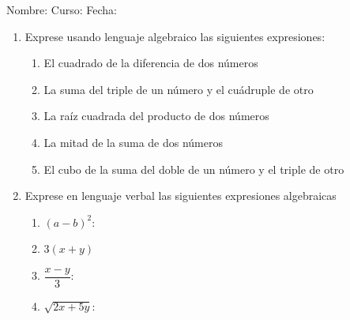 \documentclass[letterpaper,fleqn]{article}
\newcommand{\LineaNombre}{%
\par
\vspace{\baselineskip}
Nombre:\hrulefill \; Curso: \underline{\hspace*{48pt}} \; Fecha: \underline{\hspace*{2.5cm}} \relax
\par}
\begin{document}
\LineaNombre
\begin{enumerate}
 \item Exprese usando lenguaje algebraico las siguientes expresiones:
 \begin{enumerate}
  \item El cuadrado de la diferencia de dos números \answer*[0pt]
  \item La suma del triple de un número y el cuádruple de otro \answer*[0pt]
  \item La raíz cuadrada del producto de dos números\answer*[0pt]
  \item La mitad de la suma de dos números \answer*[0pt]
  \item El cubo de la suma del doble de un número y el triple de otro \answer*[0pt]
 \end{enumerate}
\item Exprese en lenguaje verbal las siguientes expresiones algebraicas
\begin{enumerate}
 \item $(a-b)^{2}$:
 \item $3(x+y)$
 \item $\dfrac{x-y}{3}$:
 \item $\sqrt{2x+5y}$:
\end{enumerate}

 \end{enumerate}
\end{document}
